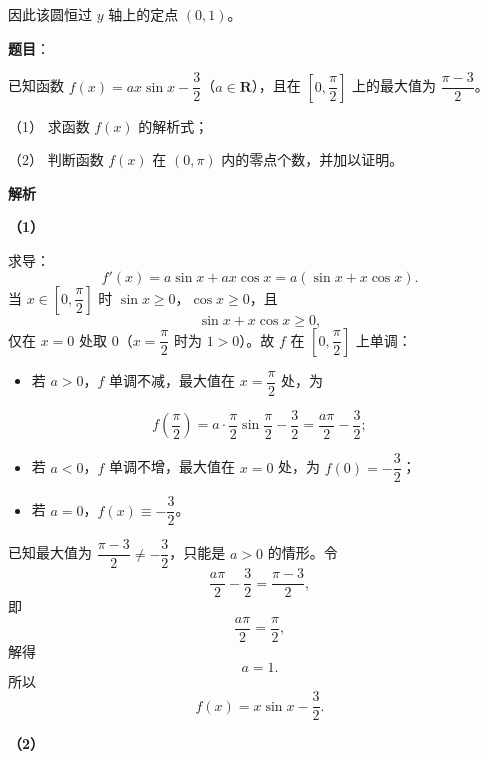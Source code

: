 \begin{answer}
因此该圆恒过 $y$ 轴上的定点 $(0,1)$。



\end{answer}
\begin{answer}

\textbf{题目}：

已知函数 $f(x)=ax\sin x-\dfrac32$（$a\in\mathbf R$），且在 $\left[0,\dfrac\pi2\right]$ 上的最大值为 $\dfrac{\pi-3}{2}$。

（1） 求函数 $f(x)$ 的解析式；

（2） 判断函数 $f(x)$ 在 $(0,\pi)$ 内的零点个数，并加以证明。

\textbf{解析}

\textbf{（1）}

求导：
\nopagebreak[4]
\[f'(x)=a\sin x+ax\cos x=a(\sin x+x\cos x).\]
当 $x\in\left[0,\dfrac\pi2\right]$ 时 $\sin x\geqslant0$，$\cos x\geqslant0$，且
\nopagebreak[4]
\[\sin x+x\cos x\geqslant0,\]
仅在 $x=0$ 处取 $0$（$x=\dfrac\pi2$ 时为 $1>0$）。故 $f$ 在 $\left[0,\dfrac\pi2\right]$ 上单调：

\begin{itemize}
\item 若 $a>0$，$f$ 单调不减，最大值在 $x=\dfrac\pi2$ 处，为
\end{itemize}
\nopagebreak[4]
\[f\left(\frac\pi2\right)=a\cdot\frac\pi2\sin\frac\pi2-\frac32=\frac{a\pi}{2}-\frac32;\]
\begin{itemize}
\item 若 $a<0$，$f$ 单调不增，最大值在 $x=0$ 处，为 $f(0)=-\dfrac32$；
\item 若 $a=0$，$f(x)\equiv-\dfrac32$。
\end{itemize}

已知最大值为 $\dfrac{\pi-3}{2}\neq-\dfrac32$，只能是 $a>0$ 的情形。令
\nopagebreak[4]
\[\frac{a\pi}{2}-\frac32=\frac{\pi-3}{2},\]
即
\nopagebreak[4]
\[\frac{a\pi}{2}=\frac\pi2,\]
解得
\nopagebreak[4]
\[a=1.\]
所以
\nopagebreak[4]
\[f(x)=x\sin x-\frac32.\]

\textbf{（2）}


\end{answer}
